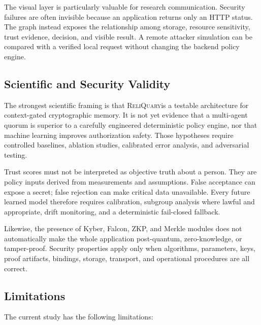 \documentclass[10pt]{article}
\newcommand{\system}{\textsc{ReliQuary}}
\begin{document}
The visual layer is particularly valuable for research communication. Security failures are often invisible because an application returns only an HTTP status. The graph instead exposes the relationship among storage, resource sensitivity, trust evidence, decision, and visible result. A remote attacker simulation can be compared with a verified local request without changing the backend policy engine.

\subsection*{Scientific and Security Validity}

The strongest scientific framing is that \system is a testable architecture for context-gated cryptographic memory. It is not yet evidence that a multi-agent quorum is superior to a carefully engineered deterministic policy engine, nor that machine learning improves authorization safety. Those hypotheses require controlled baselines, ablation studies, calibrated error analysis, and adversarial testing.

Trust scores must not be interpreted as objective truth about a person. They are policy inputs derived from measurements and assumptions. False acceptance can expose a secret; false rejection can make critical data unavailable. Every future learned model therefore requires calibration, subgroup analysis where lawful and appropriate, drift monitoring, and a deterministic fail-closed fallback.

Likewise, the presence of Kyber, Falcon, ZKP, and Merkle modules does not automatically make the whole application post-quantum, zero-knowledge, or tamper-proof. Security properties apply only when algorithms, parameters, keys, proof artifacts, bindings, storage, transport, and operational procedures are all correct.

\subsection*{Limitations}

The current study has the following limitations:
\end{document}
